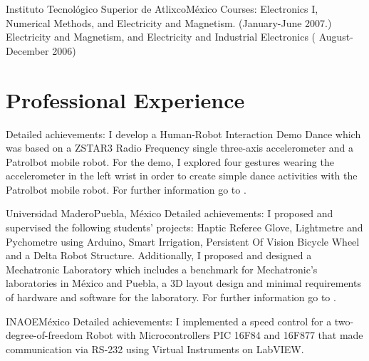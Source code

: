 \documentclass[10pt,a4paper,roman]{moderncv}
\begin{document}
{Instituto Tecnol\'ogico Superior de Atlixco}{M\'exico}{}
{Courses: Electronics I, Numerical Methods, and Electricity and Magnetism. (January-June 2007.)
Electricity and Magnetism, and Electricity and Industrial Electronics ( August-December 2006)
}


\section{Professional Experience}

{Detailed achievements: I develop a Human-Robot Interaction Demo Dance which  was based on a ZSTAR3 Radio
Frequency single three-axis accelerometer and a Patrolbot mobile robot.
For the demo, I explored four gestures wearing the accelerometer in the left wrist
in order to create simple dance activities with the Patrolbot mobile robot.
For further information go to \href{https://sites.google.com/site/perezxochicale/projects/demodance}{\faExternalLink}.}

{Universidad Madero}{Puebla, M\'exico}{}
{Detailed achievements:
I proposed and supervised the following students' projects: Haptic Referee Glove,
 Lightmetre and Pychometre using Arduino, Smart Irrigation, Persistent Of Vision Bicycle Wheel
 and a Delta Robot Structure.
\href{https://sites.google.com/site/perezxochicaleprojects/studentprojects}{\faExternalLink}
Additionally, I proposed and designed a Mechatronic Laboratory which includes a benchmark for
Mechatronic's laboratories in M\'exico and Puebla, a 3D layout design and minimal
requirements of hardware and software for the laboratory.
For further information go to \href{https://sites.google.com/site/perezxochicaleprojects/mechatronicslaboratorydesign}{\faExternalLink}.
}

{INAOE}{M\'exico}{}
{Detailed achievements:
I implemented a speed control for a two-degree-of-freedom Robot with Microcontrollers
PIC 16F84 and 16F877 that made communication via RS-232 using Virtual Instruments on LabVIEW.}

\end{document}
